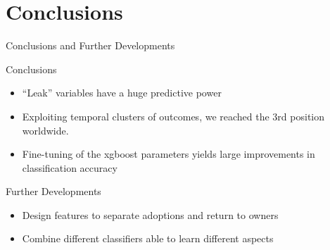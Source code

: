 \section{Conclusions}

\begin{frame}[t]{Conclusions and Further Developments}
	\begin{block}{Conclusions}
		\begin{itemize}
			\item<+-> ``Leak'' variables have a huge predictive power 
			\item<+-> Exploiting temporal clusters of outcomes, we reached the
				3rd position worldwide.
			\item<+-> Fine-tuning of the xgboost parameters yields large
				improvements in classification accuracy
		\end{itemize}
	\end{block}
	\pause
	\begin{block}{Further Developments}
		\begin{itemize}
			\item<+-> Design features to separate adoptions and return to owners
			\item<+-> Combine different classifiers able to learn different aspects 
		\end{itemize}
	\end{block}
\end{frame}


